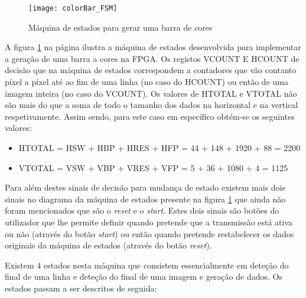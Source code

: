 \begin{figure}[h!]
	\begin{center}
		\leavevmode
		\texttt{[image: colorBar\_FSM]}
		\caption{Máquina de estados para gerar uma barra de cores}
		\label{fig:colorBar_fsm}
	\end{center}
\end{figure}

A figura \ref{fig:colorBar_fsm} na página \pageref{fig:colorBar_fsm} ilustra a máquina de estados desenvolvida para implementar a geração de uma barra a cores na FPGA. Os registos VCOUNT E HCOUNT de decisão que na máquina de estados correspondem a contadores que vão contanto píxel a píxel até ao fim de uma linha (no caso do HCOUNT) ou então de uma imagem inteira (no caso do VCOUNT). Os valores de HTOTAL e VTOTAL não são mais do que a soma de todo o tamanho dos dados na horizontal e na vertical respetivamente. Assim sendo, para este caso em específico obtém-se os seguintes valores:
\begin{itemize}
	\item HTOTAL = HSW + HBP + HRES + HFP = 44 + 148 + 1920 + 88 = 2200
	\item VTOTAL = VSW + VBP + VRES + VFP = 5 + 36 + 1080 + 4 = 1125
\end{itemize}


Para além destes sinais de decisão para mudança de estado existem mais dois sinais no diagrama da máquina de estados presente na figura \ref{fig:colorBar_fsm} que ainda não foram mencionados que são o \textit{reset} e o \textit{start}. Estes dois sinais são botões do utilizador que lhe permite definir quando pretende que a transmissão está ativa ou não (através do botão \textit{start}) ou então quando pretende restabelecer os dados originais da máquina de estados (através do botão \textit{reset}). 


Existem 4 estados nesta máquina que consistem essencialmente em deteção do final de uma linha e deteção do final de uma imagem e geração de dados. Os estados passam a ser descritos de seguida:

